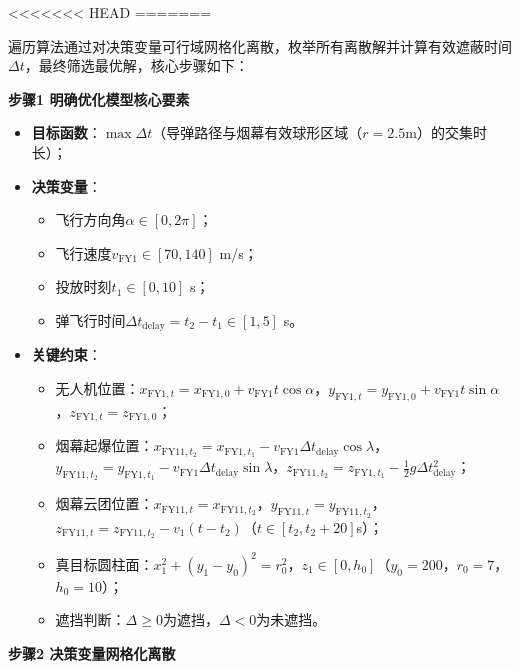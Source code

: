 \documentclass[../main.tex]{subfiles}
\begin{document}
<<<<<<< HEAD
=======

遍历算法通过对决策变量可行域网格化离散，枚举所有离散解并计算有效遮蔽时间$\Delta t$，最终筛选最优解，核心步骤如下：

\noindent\textbf{步骤1 明确优化模型核心要素}
\begin{itemize}
    \item \textbf{目标函数}：$\max \Delta t$（导弹路径与烟幕有效球形区域（$r=2.5$m）的交集时长）；
    \item \textbf{决策变量}：
          \begin{itemize}
              \item 飞行方向角$\alpha \in [0,2\pi]$；
              \item 飞行速度$v_{\text{FY1}} \in [70,140]$ m/s；
              \item 投放时刻$t_1 \in [0,10]$ s；
              \item 弹飞行时间$\Delta t_{\text{delay}}=t_2-t_1 \in [1,5]$ s。
          \end{itemize}
    \item \textbf{关键约束}：
          \begin{itemize}
              \item 无人机位置：$x_{\text{FY1},t}=x_{\text{FY1},0}+v_{\text{FY1}}t\cos\alpha$，$y_{\text{FY1},t}=y_{\text{FY1},0}+v_{\text{FY1}}t\sin\alpha$，$z_{\text{FY1},t}=z_{\text{FY1},0}$；
              \item 烟幕起爆位置：$x_{\text{FY11},t_2}=x_{\text{FY1},t_1}-v_{\text{FY1}}\Delta t_{\text{delay}}\cos\lambda$，$y_{\text{FY11},t_2}=y_{\text{FY1},t_1}-v_{\text{FY1}}\Delta t_{\text{delay}}\sin\lambda$，$z_{\text{FY11},t_2}=z_{\text{FY1},t_1}-\frac{1}{2}g\Delta t_{\text{delay}}^2$；
              \item 烟幕云团位置：$x_{\text{FY11},t}=x_{\text{FY11},t_2}$，$y_{\text{FY11},t}=y_{\text{FY11},t_2}$，$z_{\text{FY11},t}=z_{\text{FY11},t_2}-v_1(t-t_2)$（$t \in [t_2,t_2+20]$s）；
              \item 真目标圆柱面：$x_1^2+(y_1-y_0)^2=r_0^2$，$z_1 \in [0,h_0]$（$y_0=200$，$r_0=7$，$h_0=10$）；
              \item 遮挡判断：$\Delta \geq 0$为遮挡，$\Delta <0$为未遮挡。
          \end{itemize}
\end{itemize}

\noindent\textbf{步骤2 决策变量网格化离散}
\end{document}
